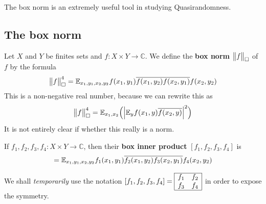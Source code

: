 \documentclass[10pt,a4paper]{report}
\begin{document}
The box norm is an extremely useful tool in studying Quasirandomness.

\subsection*{The box norm}
\quad Let $X$ and $Y$ be finites sets and $f:X\times Y \rightarrow \mathbb{C}$. We define the \textbf{box norm} $\bigl\lVert f\bigr\rVert_{\square}$ of $f$ by the formula
\begin{align*}
\bigl\lVert f\bigr\rVert_{\tiny{\square}}^4 = \mathbb{E}_{x_1,y_1,x_2,y_2} f(x_1,y_1) \overline{f(x_1,y_2)}\overline{f(x_2,y_1)} f(x_2,y_2)
\end{align*}
This is a non-negative real number, because we can rewrite this as
\begin{align*}
\bigl\lVert f\bigr\rVert_{\tiny{\square}}^4 = \mathbb{E}_{x_1,x_2} \Big( \Big| \mathbb{E}_y f(x_1,y) \overline{f(x_2,y)} \Big|^2 \Big)
\end{align*}
It is not entirely clear if whether this really is a norm.
\s

\quad If $f_1,f_2,f_3,f_4 :X\times Y \rightarrow \mathbb{C}$, then their \textbf{box inner product} $[f_1,f_2,f_3,f_4]$ is
\begin{align*}
[f_1,f_2,f_3,f_4] = \avg_{x_1,y_1,x_2,y_2} f_1(x_1,y_1) \bar{f_2(x_1,y_2)} \bar{f_3(x_2,y_1)} f_4(x_2,y_2)
\end{align*}
\s

We shall \emph{temporarily} use the notation $[f_1,f_2,f_3,f_4]=\boxinn{f_1}{f_2}{f_3}{f_4}$ in order to expose the symmetry.
\s
\end{document}
